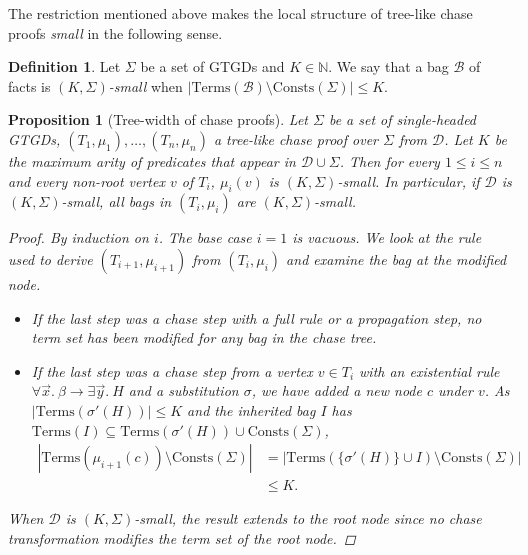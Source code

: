 \documentclass[12pt]{report}
\theoremstyle{plain}
\newtheorem{proposition}[theorem]{Proposition}
\theoremstyle{definition}
\newtheorem{definition}[theorem]{Definition}
\def\Consts{{\mathrm{Consts}}}
\def\Terms{{\mathrm{Terms}}}
\begin{document}
The restriction mentioned above makes the local structure of tree-like chase proofs \emph{small} in the following sense.

\begin{definition}
  Let $\Sigma$ be a set of GTGDs and $K \in \mathbb{N}$. We say that a bag $\mathcal{B}$ of facts is \emph{$(K, \Sigma)$-small} when $|\Terms(\mathcal{B}) \setminus \Consts(\Sigma)| \leq K$.
\end{definition}

\begin{proposition}[Tree-width of chase proofs]
\label{proposition:chase-proofs-tree-width}
  Let $\Sigma$ be a set of \emph{single-headed} GTGDs, $(T_1, \mu_1), \ldots, (T_n, \mu_n)$ a tree-like chase proof over $\Sigma$ from $\mathcal{D}$. Let $K$ be the maximum arity of predicates that appear in $\mathcal{D} \cup \Sigma$. Then for every $1 \leq i \leq n$ and every non-root vertex $v$ of $T_i$, $\mu_i(v)$ is $(K, \Sigma)$-small. In particular, if $\mathcal{D}$ is $(K, \Sigma)$-small, all bags in $(T_i, \mu_i)$ are $(K, \Sigma)$-small.
  \begin{proof}
    By induction on $i$. The base case $i = 1$ is vacuous. We look at the rule used to derive $(T_{i+1}, \mu_{i+1})$ from $(T_{i}, \mu_{i})$ and examine the bag at the modified node.
    \begin{itemize}
      \item If the last step was a chase step with a full rule or a propagation step, no term set has been modified for any bag in the chase tree.
      \item If the last step was a chase step from a vertex $v \in T_i$ with an existential rule $\forall \vec{x}.\ \beta \rightarrow \exists \vec{y}.\ H$ and a substitution $\sigma$, we have added a new node $c$ under $v$. As $|\Terms(\sigma'(H))| \leq K$ and the inherited bag $I$ has $\Terms(I) \subseteq \Terms(\sigma'(H)) \cup \Consts(\Sigma)$,
      \begin{equation*}
        \begin{split}
          |\Terms(\mu_{i+1}(c)) \setminus \Consts(\Sigma)|
            &= |\Terms(\{\sigma'(H)\} \cup I) \setminus \Consts(\Sigma)| \\
            &\leq K.
        \end{split}
      \end{equation*}
    \end{itemize}
    When $\mathcal{D}$ is $(K, \Sigma)$-small, the result extends to the root node since no chase transformation modifies the term set of the root node.
  \end{proof}
\end{proposition}
\end{document}
